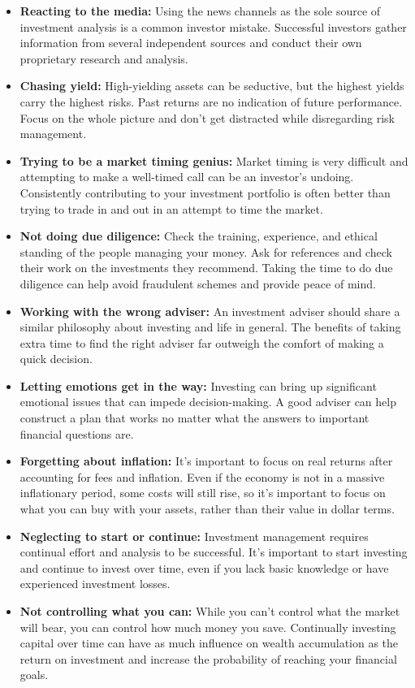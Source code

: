 {\begin{itemize}
	\item
	\textbf{Reacting to the media:}
	Using the news channels as the sole source of investment analysis is a common investor mistake. Successful investors gather information from several independent sources and conduct their own proprietary research and analysis.
	\item
	\textbf{Chasing yield:}
	High-yielding assets can be seductive, but the highest yields carry the highest risks. Past returns are no indication of future performance. Focus on the whole picture and don't get distracted while disregarding risk management.
	\item
	\textbf{Trying to be a market timing genius:}
	Market timing is very difficult and attempting to make a well-timed call can be an investor's undoing. Consistently contributing to your investment portfolio is often better than trying to trade in and out in an attempt to time the market.
	\item
	\textbf{Not doing due diligence:}
	Check the training, experience, and ethical standing of the people managing your money. Ask for references and check their work on the investments they recommend. Taking the time to do due diligence can help avoid fraudulent schemes and provide peace of mind.
	\item
	\textbf{Working with the wrong adviser:}
	An investment adviser should share a similar philosophy about investing and life in general. The benefits of taking extra time to find the right adviser far outweigh the comfort of making a quick decision.
	\item
	\textbf{Letting emotions get in the way:}
	Investing can bring up significant emotional issues that can impede decision-making. A good adviser can help construct a plan that works no matter what the answers to important financial questions are.
	\item
	\textbf{Forgetting about inflation:}
	It's important to focus on real returns after accounting for fees and inflation. Even if the economy is not in a massive inflationary period, some costs will still rise, so it's important to focus on what you can buy with your assets, rather than their value in dollar terms.
	\item
	\textbf{Neglecting to start or continue:}
	Investment management requires continual effort and analysis to be successful. It's important to start investing and continue to invest over time, even if you lack basic knowledge or have experienced investment losses.
	\item
	\textbf{Not controlling what you can:}
	While you can't control what the market will bear, you can control how much money you save. Continually investing capital over time can have as much influence on wealth accumulation as the return on investment and increase the probability of reaching your financial goals.
\end{itemize}
}

